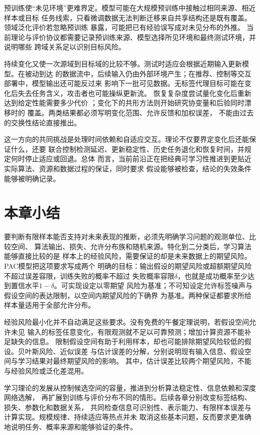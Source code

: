 预训练使“未见环境”更难界定。模型可能在大规模预训练中接触过相同来源、相近样本或目标
任务线索，只看微调数据无法判断迁移来自共享结构还是既有覆盖。领域泛化评价若忽略预训练
暴露，可能把已有经验误写成对未见分布的外推。
当前理论与评价协议都需要记录预训练来源、模型选择所见环境和最终测试环境，并说明哪些
跨域关系足以识别目标风险。

持续变化又使一次源域到目标域的比较不够。测试时适应会根据近期输入更新模型。在被动到达
的数据流中，后续输入仍由外部环境产生；在推荐、控制等交互部署中，模型输出还可能反过来
影响下一批可见数据。无标签代理目标可能在变化后失去任务含义，攻击者也可能操纵更新流。
恢复复杂度尝试量化变化后重新达到给定性能需要多少代价
；变化下的共形方法则开始研究协变量和后验同时漂移时的
覆盖。两类结果都必须写明变化范围、允许反馈和加权误差，
不能由过去的交换性结论直接推出。

这一方向的共同挑战是处理时间依赖和自适应交互。理论不仅要界定变化后还能保证什么，还要
联合控制检测延迟、更新稳定性、历史任务退化和恢复时间，并规定何时停止适应或回退。总体
而言，当前前沿正在把经典可学习性推进到更贴近实际算法、资源和数据过程的保证，同时要求
假设能够被检查，结论的失效条件能够被明确记录。

\section{本章小结}
\label{sec:statistical-framework-summary}

要判断有限样本能否支持对未来表现的推断，必须先明确学习问题的观测单位、比较空间、
算法输出、损失、允许分布族和随机来源。特化到二分类后，学习算法能够直接比较的是
样本上的经验风险，需要保证的却是未来数据上的期望风险。PAC模型把这项要求写成两个
明确的目标：输出假设的期望风险或超额期望风险不超过误差容限，训练失败的概率不超过
失败概率容限$\delta$，也就是成功概率至少达到置信水平$1-\delta$。可实现设定以零期望
风险为基准；不可知设定允许标签噪声与假设空间的表达限制，以空间内期望风险的下确界
为基准。两种保证都要求所给样本量适用于全部允许分布。

经验风险最小化并不自动满足这些要求。没有免费的午餐定理说明，若假设空间允许未见
输入的标签任意变化，有限观测就不足以可靠预测；增加计算资源不能补足缺失的信息。
限制假设空间有助于利用样本，却也可能排除期望风险较低的假设。贝叶斯风险、近似误差
与估计误差的分解，分别说明现有输入信息、假设空间与学习结果对最终期望风险的影响。
其中，估计误差比较两个期望风险，不能与经验风险或泛化差混用。

学习理论的发展从控制候选空间的容量，推进到分析算法稳定性、信息依赖和深度网络选解，
再扩展到训练与评价分布不同的情形。后续各章分别改变标签结构、损失、参数化和数据关系，
共同检查信息可识别性、表示能力、有限样本误差与计算实现。规模规律、持续适应等热点并未
取消这些基本问题，反而要求更准确地说明任务、概率来源和能够验证的条件。

